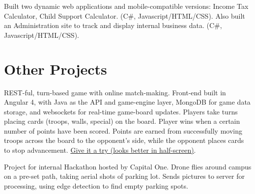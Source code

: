 \documentclass[letterpaper]{deedy-resume} %
\begin{document}
\begin{minipage}[t]{0.7\textwidth}
\sectionsep %



Built two dynamic web applications and mobile-compatible versions: Income Tax Calculator, Child Support Calculator. (C\#, Javascript/HTML/CSS). Also built an Administration site to track and display internal business data. (C\#, Javascript/HTML/CSS).


\sectionsep %


\section{Other Projects}



REST-ful, turn-based game with online match-making. Front-end built in Angular 4, with Java as the API and game-engine layer, MongoDB for game data storage, and websockets for real-time game-board updates. Players take turns placing cards (troops, walls, special) on the board. Player wins when a certain number of points have been scored. Points are earned from successfully moving troops across the board to the opponent's side, while the opponent places cards to stop advancement. \href{http://3.85.160.165:4200/}{Give it a try (looks better in half-screen)}.

\sectionsep %


Project for internal Hackathon hosted by Capital One. Drone flies around campus on a pre-set path, taking aerial shots of parking lot. Sends pictures to server for processing, using edge detection to find empty parking spots. 

\sectionsep %



\end{minipage}
\end{document}
